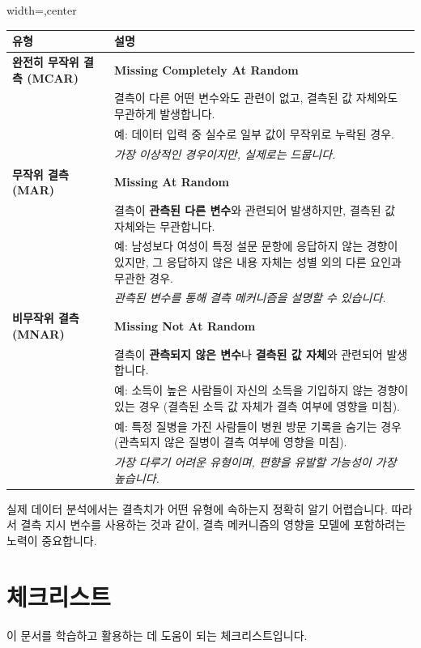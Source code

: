 \documentclass[11pt,a4paper]{article}
\theoremstyle{definition}
\newcommand{\newsection}[1]{\newpage\section{#1}}
\begin{document}
\begin{adjustbox}{width=\textwidth,center}
\begin{tabular}{p{} p{}}
\toprule
\textbf{유형} & \textbf{설명} \\
\midrule
\textbf{완전히 무작위 결측 (MCAR)} & \textbf{Missing Completely At Random} \\
& 결측이 다른 어떤 변수와도 관련이 없고, 결측된 값 자체와도 무관하게 발생합니다. \\
& 예: 데이터 입력 중 실수로 일부 값이 무작위로 누락된 경우. \\
& \textit{가장 이상적인 경우이지만, 실제로는 드뭅니다.} \\
\midrule
\textbf{무작위 결측 (MAR)} & \textbf{Missing At Random} \\
& 결측이 \textbf{관측된 다른 변수}와 관련되어 발생하지만, 결측된 값 자체와는 무관합니다. \\
& 예: 남성보다 여성이 특정 설문 문항에 응답하지 않는 경향이 있지만, 그 응답하지 않은 내용 자체는 성별 외의 다른 요인과 무관한 경우. \\
& \textit{관측된 변수를 통해 결측 메커니즘을 설명할 수 있습니다.} \\
\midrule
\textbf{비무작위 결측 (MNAR)} & \textbf{Missing Not At Random} \\
& 결측이 \textbf{관측되지 않은 변수}나 \textbf{결측된 값 자체}와 관련되어 발생합니다. \\
& 예: 소득이 높은 사람들이 자신의 소득을 기입하지 않는 경향이 있는 경우 (결측된 소득 값 자체가 결측 여부에 영향을 미침). \\
& 예: 특정 질병을 가진 사람들이 병원 방문 기록을 숨기는 경우 (관측되지 않은 질병이 결측 여부에 영향을 미침). \\
& \textit{가장 다루기 어려운 유형이며, 편향을 유발할 가능성이 가장 높습니다.} \\
\bottomrule
\end{tabular}
\end{adjustbox}

\begin{warningbox}[title=결측치 유형의 불확실성]
실제 데이터 분석에서는 결측치가 어떤 유형에 속하는지 정확히 알기 어렵습니다. 따라서 결측 지시 변수를 사용하는 것과 같이, 결측 메커니즘의 영향을 모델에 포함하려는 노력이 중요합니다.
\end{warningbox}

\newsection{체크리스트}

이 문서를 학습하고 활용하는 데 도움이 되는 체크리스트입니다.
\end{document}
